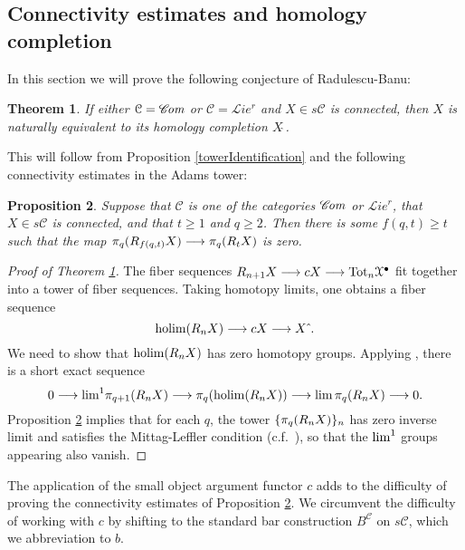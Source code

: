 \documentclass[11pt]{amsart} \renewcommand{\baselinestretch}{1.2}
\theoremstyle{plain}
\newtheorem{thm}{Theorem}[section] %
\newtheorem{prop}[thm]{Proposition}
\numberwithin{equation}{section} %
\theoremstyle{plain}
\newtheorem{thm}{Theorem}[chapter] %
\newtheorem{prop}[thm]{Proposition}
\numberwithin{equation}{chapter} %
\DeclareMathOperator*{\holim}{holim}
\renewcommand{\to}{\longrightarrow}
\newcommand{\scrL}{\mathscr{L}}
\newcommand{\scrC}{\mathscr{C}}
\newcommand{\calx}{\mathcal{X}}
\newcommand{\calc}{\mathcal{C}}
\newcommand{\citeBOX}[2][]{\cite[\mbox{#1}]{#2}}
\newcommand{\algs}{{\scrC\!\textit{\normalfont\textit{om}}}}
\newcommand{\restliealgs}{{\scrL\!\textit{ie}^\textit{r}}}
\newcommand{\algcat}{{\calc}}%
\newcommand{\dupdown}[2]{R_{\smash{#1}}}
\newcommand{\algCat}{\calc}
\newcommand{\barConstructionMightAbbreviate}{b}
\newcommand{\SubsectionOrSection}[1]{\subsection{#1}}
\begin{document}
\begin{Bousfield-Kan spectral sequence}
\SubsectionOrSection{Connectivity estimates and homology completion}
\label{sec:connectivityAnalysis}
In this section we will prove
the following conjecture of Radulescu-Banu:
\begin{thm}
\label{completenesstheorem}
If either $\algcat=\algs$ or $\algcat=\restliealgs$ and $X\in s\algcat$ is connected, then $X$ is naturally equivalent to its homology completion $X\hat{\ }$.
\end{thm}
This will follow from Proposition \ref{towerIdentification} and the following connectivity estimates in the Adams tower:
\begin{prop}
\label{convergenceProp}
Suppose that $\algcat$ is one of the categories $\algs$ or $\restliealgs$, that $X\in s\algcat$ is connected, and that  $t\geq1$ and $q\geq2$. Then there is some $f(q,t)\geq t$ such that the map $\pi_q(\dupdown{f(q,t)}{c}X)\to\pi_q(\dupdown{t}{c}X)$ is zero.
\end{prop}
\begin{proof}[Proof of Theorem \ref{completenesstheorem}]
The fiber sequences $\dupdown{n+1}{c}X\to cX\to \textup{Tot}_n\calx^\bullet$ fit together into a tower of fiber sequences. Taking homotopy limits, one obtains a fiber sequence
\[\holim (\dupdown{n}{c}X)\to cX\to X\hat{\ }.\]
We need to show that $\holim (\dupdown{n}{c}X)$ has zero homotopy groups.
Applying \cite[Proposition 6.14]{goerss-jardine.pdf}, there is a short exact sequence
\[0\to \textup{lim}^1\pi_{q+1}(\dupdown{n}{c}X)\to \pi_q(\holim (\dupdown{n}{c}X))\to \textup{lim}\,\pi_{q}(\dupdown{n}{c}X)\to 0.\]
Proposition \ref{convergenceProp} implies that for each $q$, the tower $\{\pi_{q}(\dupdown{n}{c}X)\}_n$ has zero inverse limit and satisfies the Mittag-Leffler condition (c.f.\ \citeBOX[p.~264]{YellowMonster}), so that the $\textup{lim}^1$ groups appearing also vanish.
\end{proof}
The application of the small object argument functor $c$ adds to the difficulty of proving the connectivity estimates of Proposition \ref{convergenceProp}. We circumvent the difficulty of working with $c$ by shifting to the standard bar construction $B^{\algCat}$ on $s\algCat$, which we abbreviation to $\barConstructionMightAbbreviate $.


\end{Bousfield-Kan spectral sequence}
\end{document}
